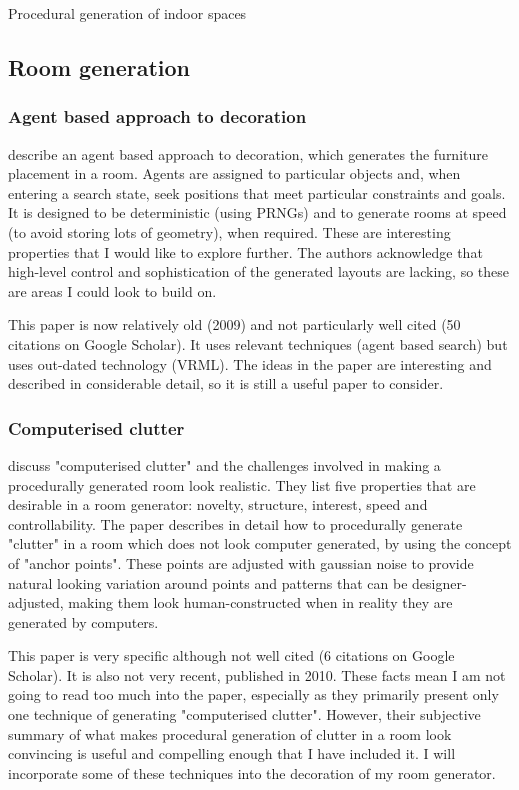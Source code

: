 \documentclass[review]{cmpreport}
\begin{document}
\begin{section}{Procedural generation of indoor spaces}

\subsection{Room generation}
\subsubsection{Agent based approach to decoration}
\cite{doi:10.1111/j.1467-8659.2009.01351.x} describe an agent based approach to decoration, which generates the furniture placement in a room. Agents are assigned to particular objects and, when entering a search state, seek positions that meet particular constraints and goals. It is designed to be deterministic (using PRNGs) and to generate rooms at speed (to avoid storing lots of geometry), when required. These are interesting properties that I would like to explore
further. The authors acknowledge that high-level control and sophistication of the generated layouts are lacking, so these are areas I could look to build on. \par
This paper is now relatively old (2009) and not particularly well cited (50 citations on Google Scholar). It uses relevant techniques (agent based search) but uses out-dated technology (VRML). The ideas in the paper are interesting and described in considerable detail, so it is still a useful paper to consider. 

\subsubsection{Computerised clutter}
\cite{taylor-parberry} discuss "computerised clutter" and the challenges involved in making a procedurally generated room look realistic. They list five properties that are desirable in a room generator: novelty, structure, interest, speed and controllability. The paper describes in detail how to procedurally generate "clutter" in a room which does not look computer generated, by using the concept of "anchor points". These points are adjusted with gaussian noise to provide natural looking variation around points and patterns that can be designer-adjusted, making them look human-constructed when in reality they are generated by computers.\par
This paper is very specific although not well cited (6 citations on Google Scholar). It is also not very recent, published in 2010. These facts mean I am not going to read too much into the paper, especially as they primarily present only one technique of generating "computerised clutter". However, their subjective summary of what makes procedural generation of clutter in a room look convincing is useful and compelling enough that I have included it. I will incorporate some of these techniques into the decoration of my room generator.


\end{section}
\end{document}
